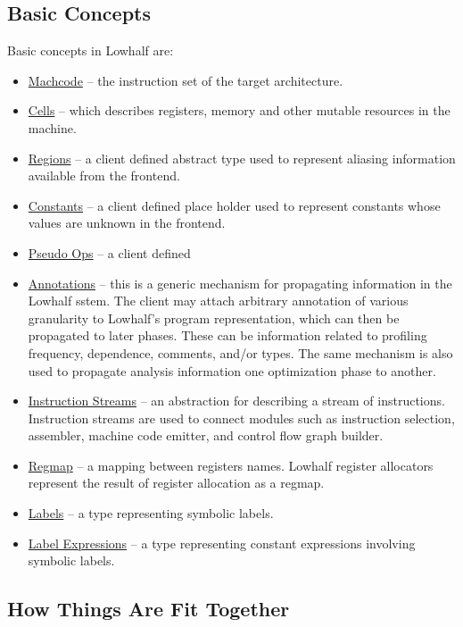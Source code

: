 \subsection{Basic Concepts}

  Basic concepts in Lowhalf are: 
\begin{itemize}
    \item \href{instructions.html}{Machcode} --
    the instruction set of the target architecture.
    \item \href{cells.html}{Cells} -- which describes registers,
memory and other mutable resources in the machine.
    \item \href{regions.html}{Regions} -- a client defined
   abstract type used to represent aliasing information available from
the frontend.
    \item \href{constants.html}{Constants} -- a client defined
   place holder used to represent constants whose values are unknown 
   in the frontend. 
    \item \href{pseudo-ops.html}{Pseudo Ops} -- a client defined
      
    \item \href{annotations.html}{Annotations} -- this is
   a generic mechanism for propagating information in the Lowhalf sstem.
   The client may attach arbitrary annotation of various granularity 
   to Lowhalf's program representation,
   which can then be propagated to later phases.
   These can be information related to profiling frequency, dependence, 
   comments, and/or types.
   The same mechanism is also used to propagate 
   analysis information one optimization phase to 
   another.
    \item \href{streams.html}{Instruction Streams} -- an abstraction
   for describing a stream of instructions.  Instruction streams are
   used to connect modules such as instruction selection,  assembler, 
   machine code emitter, and 
   control flow graph builder.
   \item \href{regmap.html}{Regmap} -- a mapping between registers
     names.  Lowhalf register allocators represent the result of register
   allocation as a regmap.
   \item \href{labels.html}{Labels} -- a type representing
symbolic labels.
   \item \href{labelexp.html}{Label Expressions} -- a type representing
     constant expressions
    involving symbolic labels.
\end{itemize}

\subsection{How Things Are Fit Together}

